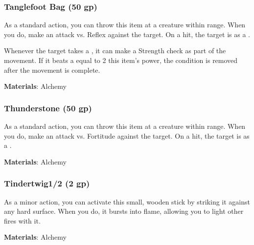 \lowercase{\hypertarget{item:Tanglefoot Bag}{}}\label{item:Tanglefoot Bag}
\hypertarget{item:Tanglefoot Bag}{\subsubsection{Tanglefoot Bag\hfill{} (50 gp)}}

As a standard action, you can throw this item at a creature within \rngclose range.
When you do, make an attack vs. Reflex against the target.
On a hit, the target is  as a .

Whenever the target takes a , it can make a Strength check as part of the movement.
If it beats a  equal to 2 \add this item's power, the condition is removed after the movement is complete.



\vspace{0.25em}
\textbf{Materials}: Alchemy


\lowercase{\hypertarget{item:Thunderstone}{}}\label{item:Thunderstone}
\hypertarget{item:Thunderstone}{\subsubsection{Thunderstone\hfill{} (50 gp)}}

As a standard action, you can throw this item at a creature within \rngclose range.
When you do, make an attack vs. Fortitude against the target.
On a hit, the target is  as a .



\vspace{0.25em}
\textbf{Materials}: Alchemy


\lowercase{\hypertarget{item:Tindertwig}{}}\label{item:Tindertwig}
\hypertarget{item:Tindertwig}{\subsubsection{Tindertwig\hfill1/2 (2 gp)}}

As a minor action, you can activate this small, wooden stick by striking it against any hard surface.
When you do, it bursts into flame, allowing you to light other fires with it.



\vspace{0.25em}
\textbf{Materials}: Alchemy
